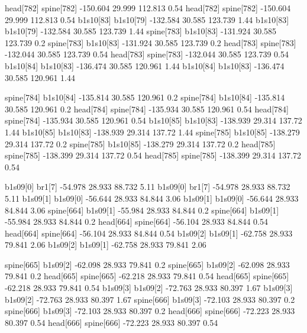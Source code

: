 head[782]    spine[782]    -150.604    29.999    112.813    0.54
head[782]    spine[782]    -150.604    29.999    112.813    0.54
b1s10[83]    b1s10[79]    -132.584    30.585    123.739    1.44
b1s10[83]    b1s10[79]    -132.584    30.585    123.739    1.44
spine[783]    b1s10[83]    -131.924    30.585    123.739    0.2
spine[783]    b1s10[83]    -131.924    30.585    123.739    0.2
head[783]    spine[783]    -132.044    30.585    123.739    0.54
head[783]    spine[783]    -132.044    30.585    123.739    0.54
b1s10[84]    b1s10[83]    -136.474    30.585    120.961    1.44
b1s10[84]    b1s10[83]    -136.474    30.585    120.961    1.44


spine[784]    b1s10[84]    -135.814    30.585    120.961    0.2
spine[784]    b1s10[84]    -135.814    30.585    120.961    0.2
head[784]    spine[784]    -135.934    30.585    120.961    0.54
head[784]    spine[784]    -135.934    30.585    120.961    0.54
b1s10[85]    b1s10[83]    -138.939    29.314    137.72    1.44
b1s10[85]    b1s10[83]    -138.939    29.314    137.72    1.44
spine[785]    b1s10[85]    -138.279    29.314    137.72    0.2
spine[785]    b1s10[85]    -138.279    29.314    137.72    0.2
head[785]    spine[785]    -138.399    29.314    137.72    0.54
head[785]    spine[785]    -138.399    29.314    137.72    0.54


b1s09[0]    br1[7]    -54.978    28.933    88.732    5.11
b1s09[0]    br1[7]    -54.978    28.933    88.732    5.11
b1s09[1]    b1s09[0]    -56.644    28.933    84.844    3.06
b1s09[1]    b1s09[0]    -56.644    28.933    84.844    3.06
spine[664]    b1s09[1]    -55.984    28.933    84.844    0.2
spine[664]    b1s09[1]    -55.984    28.933    84.844    0.2
head[664]    spine[664]    -56.104    28.933    84.844    0.54
head[664]    spine[664]    -56.104    28.933    84.844    0.54
b1s09[2]    b1s09[1]    -62.758    28.933    79.841    2.06
b1s09[2]    b1s09[1]    -62.758    28.933    79.841    2.06


spine[665]    b1s09[2]    -62.098    28.933    79.841    0.2
spine[665]    b1s09[2]    -62.098    28.933    79.841    0.2
head[665]    spine[665]    -62.218    28.933    79.841    0.54
head[665]    spine[665]    -62.218    28.933    79.841    0.54
b1s09[3]    b1s09[2]    -72.763    28.933    80.397    1.67
b1s09[3]    b1s09[2]    -72.763    28.933    80.397    1.67
spine[666]    b1s09[3]    -72.103    28.933    80.397    0.2
spine[666]    b1s09[3]    -72.103    28.933    80.397    0.2
head[666]    spine[666]    -72.223    28.933    80.397    0.54
head[666]    spine[666]    -72.223    28.933    80.397    0.54


